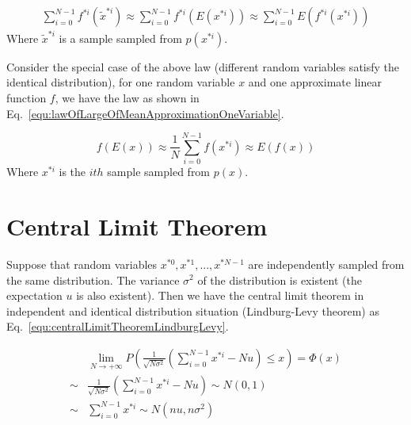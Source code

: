 \documentclass[runningheads,openany]{xhlPaper}
\begin{document}
\begin{equation}
\label{equ:lawOfLargeOfMeanApproximation}
\begin{aligned}
\sum\limits_{i = 0}^{N - 1} {{f^{*i}}\left( {{{\tilde x}^{*i}}} \right)}  \approx \sum\limits_{i = 0}^{N - 1} {{f^{*i}}\left( {E\left( {{x^{*i}}} \right)} \right)}  \approx \sum\limits_{i = 0}^{N - 1} {E\left( {{f^{*i}}\left( {{x^{*i}}} \right)} \right)} 
\end{aligned}
\end{equation}
Where $\tilde x^{*i}$ is a sample sampled from $p\left(x^{*i}\right)$.

Consider the special case of the above law (different random variables satisfy the identical distribution), for one random variable $x$ and one approximate linear function $f$, we have the law as shown in Eq.~\ref{equ:lawOfLargeOfMeanApproximationOneVariable}.

\begin{equation}
\label{equ:lawOfLargeOfMeanApproximationOneVariable}
f\left( {E\left( x \right)} \right) \approx \frac{1}{N}\sum\limits_{i = 0}^{N - 1} {f\left( {{x^{*i}}} \right)}  \approx E\left( {f\left( x \right)} \right)
\end{equation}
Where $x^{*i}$ is the $ith$ sample sampled from $p\left(x\right)$.

\section{Central Limit Theorem}
Suppose that random variables $x^{*0}, x^{*1},..., x^{*N-1}$ are independently sampled from the same distribution. The variance $\sigma ^ 2$ of the distribution is existent (the expectation $u$ is also existent). Then we have the central limit theorem in independent and identical distribution situation (Lindburg-Levy theorem) as Eq.~\ref{equ:centralLimitTheoremLindburgLevy}.

\begin{equation}
\label{equ:centralLimitTheoremLindburgLevy}
\begin{aligned}
&\mathop {\lim }\limits_{N \to  + \infty } P\left( {\frac{1}{{\sqrt {N{\sigma ^2}} }}\left( {\sum\limits_{i = 0}^{N - 1} {{x^{*i}}}  - Nu} \right) \le x} \right) = \Phi \left( {x} \right)\\
 \sim &\frac{1}{{\sqrt {N{\sigma ^2}} }}\left( {\sum\limits_{i = 0}^{N - 1} {{x^{*i}}}  - Nu} \right) \sim N\left( {0,1} \right)\\
 \sim &\sum\limits_{i = 0}^{N - 1} {{x^{*i}}}  \sim N\left( {nu,n{\sigma ^2}} \right)
\end{aligned}
\end{equation}
\end{document}
